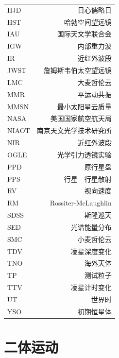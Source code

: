 \begin{multicols}{2}
\begin{tabularx}{0.85\linewidth}{@{\extracolsep{\fill}}lr}
\centering
HJD			&   日心儒略日				\\
HST			&   哈勃空间望远镜			\\
IAU			&   国际天文学联合会		\\
IGW			&   内部重力波				\\
IR			&   近红外波段				\\
JWST		&   詹姆斯韦伯太空望远镜		\\
LMC			&   大麦哲伦云				\\
MMR		&   平运动共振				\\   
MMSN		&   最小太阳星云质量		\\
NASA		&   美国国家航空航天局		\\
NIAOT		&   南京天文光学技术研究所	\\
NIR			&   近红外波段				\\
OGLE		&   光学引力透镜实验		\\
PPD			&   原行星盘				\\
PPS			&   行星---行星散射			\\
RV			&   视向速度				\\
RM 			&   Rossiter-McLaughlin 		\\
SDSS		&   斯隆巡天				\\
SED			&   光谱能量分布			\\
SMC			&   小麦哲伦云				\\
TDV			&   凌星深度变化			\\
TNO			&   海外天体				\\
TP			&   测试粒子				\\
TTV			&   凌星计时变化			\\
UT			&   世界时					\\
YSO			&   初期恒星体				
\end{tabularx}
\end{multicols}


\chapter{二体运动} \label{apdx:twobodyproblem}

